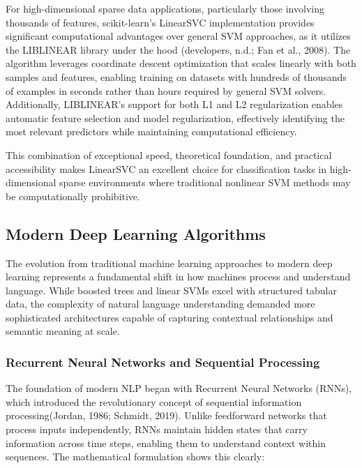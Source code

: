 \documentclass[
  titlepage]{article}
\begin{document}
For high-dimensional sparse data applications, particularly those
involving thousands of features, scikit-learn's LinearSVC implementation
provides significant computational advantages over general SVM
approaches, as it utilizes the LIBLINEAR library under the hood
(developers, n.d.; Fan et al., 2008). The algorithm leverages coordinate
descent optimization that scales linearly with both samples and
features, enabling training on datasets with hundreds of thousands of
examples in seconds rather than hours required by general SVM solvers.
Additionally, LIBLINEAR's support for both L1 and L2 regularization
enables automatic feature selection and model regularization,
effectively identifying the most relevant predictors while maintaining
computational efficiency.

This combination of exceptional speed, theoretical foundation, and
practical accessibility makes LinearSVC an excellent choice for
classification tasks in high-dimensional sparse environments where
traditional nonlinear SVM methods may be computationally prohibitive.

\subsection{Modern Deep Learning
Algorithms}\label{modern-deep-learning-algorithms}

The evolution from traditional machine learning approaches to modern
deep learning represents a fundamental shift in how machines process and
understand language. While boosted trees and linear SVMs excel with
structured tabular data, the complexity of natural language
understanding demanded more sophisticated architectures capable of
capturing contextual relationships and semantic meaning at scale.

\subsubsection{Recurrent Neural Networks and Sequential
Processing}\label{recurrent-neural-networks-and-sequential-processing}

The foundation of modern NLP began with Recurrent Neural Networks
(RNNs), which introduced the revolutionary concept of sequential
information processing(Jordan, 1986; Schmidt, 2019). Unlike feedforward
networks that process inputs independently, RNNs maintain hidden states
that carry information across time steps, enabling them to understand
context within sequences. The mathematical formulation shows this
clearly:
\end{document}
